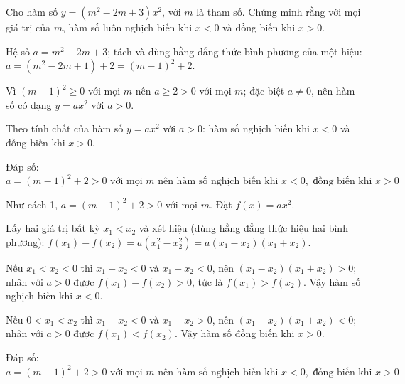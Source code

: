 \begin{problem}[9DS-HSB2-004]
Cho hàm số $y = (m^2 - 2m + 3)x^2$, với $m$ là tham số. Chứng minh rằng với mọi giá trị của $m$, hàm số luôn nghịch biến khi $x < 0$ và đồng biến khi $x > 0$.

\begin{solution}[cách 1: dùng tính chất của hàm số $y = ax^2$]
Hệ số $a = m^2 - 2m + 3$; tách và dùng hằng đẳng thức bình phương của một hiệu: $a = (m^2 - 2m + 1) + 2 = (m - 1)^2 + 2$.

Vì $(m - 1)^2 \geq 0$ với mọi $m$ nên $a \geq 2 > 0$ với mọi $m$; đặc biệt $a \neq 0$, nên hàm số có dạng $y = ax^2$ với $a > 0$.

Theo tính chất của hàm số $y = ax^2$ với $a > 0$: hàm số nghịch biến khi $x < 0$ và đồng biến khi $x > 0$.

Đáp số: $\boxed{a = (m - 1)^2 + 2 > 0 \text{ với mọi } m \text{ nên hàm số nghịch biến khi } x < 0, \text{ đồng biến khi } x > 0}$
\end{solution}

\begin{solution}
Như cách 1, $a = (m - 1)^2 + 2 > 0$ với mọi $m$. Đặt $f(x) = ax^2$.

Lấy hai giá trị bất kỳ $x_1 < x_2$ và xét hiệu (dùng hằng đẳng thức hiệu hai bình phương): $f(x_1) - f(x_2) = a(x_1^2 - x_2^2) = a(x_1 - x_2)(x_1 + x_2)$.

Nếu $x_1 < x_2 < 0$ thì $x_1 - x_2 < 0$ và $x_1 + x_2 < 0$, nên $(x_1 - x_2)(x_1 + x_2) > 0$; nhân với $a > 0$ được $f(x_1) - f(x_2) > 0$, tức là $f(x_1) > f(x_2)$. Vậy hàm số nghịch biến khi $x < 0$.

Nếu $0 < x_1 < x_2$ thì $x_1 - x_2 < 0$ và $x_1 + x_2 > 0$, nên $(x_1 - x_2)(x_1 + x_2) < 0$; nhân với $a > 0$ được $f(x_1) < f(x_2)$. Vậy hàm số đồng biến khi $x > 0$.

Đáp số: $\boxed{a = (m - 1)^2 + 2 > 0 \text{ với mọi } m \text{ nên hàm số nghịch biến khi } x < 0, \text{ đồng biến khi } x > 0}$
\end{solution}
\end{problem}

